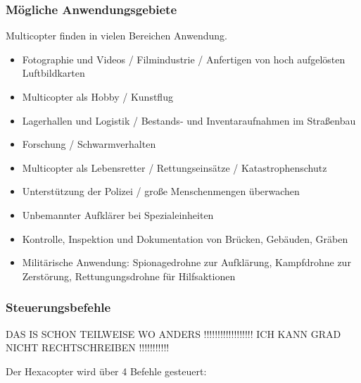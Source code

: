 
  \subsubsection{Mögliche Anwendungsgebiete}
  Multicopter finden in vielen Bereichen Anwendung. \cite{copterAnwendung}
  \begin{itemize}
    \item Fotographie und Videos / Filmindustrie / Anfertigen von hoch aufgelösten Luftbildkarten
    \item Multicopter als Hobby / Kunstflug
    \item Lagerhallen und Logistik / Bestands- und Inventaraufnahmen im Straßenbau
    \item Forschung / Schwarmverhalten
    \item Multicopter als Lebensretter / Rettungseinsätze / Katastrophenschutz
    \item Unterstützung der Polizei / große Menschenmengen überwachen
    \item Unbemannter Aufklärer bei Spezialeinheiten
    \item Kontrolle, Inspektion und Dokumentation von Brücken, Gebäuden, Gräben
    \item Militärische Anwendung: Spionagedrohne zur Aufklärung, Kampfdrohne zur Zerstörung, Rettungungsdrohne für Hilfsaktionen
  \end{itemize}  
  

  \subsubsection{Steuerungsbefehle}

  

  DAS IS SCHON TEILWEISE WO ANDERS !!!!!!!!!!!!!!!!!!
  ICH KANN GRAD NICHT RECHTSCHREIBEN !!!!!!!!!!!

  Der Hexacopter wird über 4 Befehle gesteuert: \cite{GrundlagenMulticopter}

